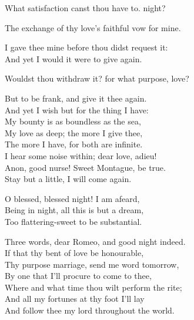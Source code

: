\begin{speech}
What satisfaction canst thou have to. night? \\
\end{speech}
\begin{speech}
The exchange of thy love's faithful vow for mine.
\\
\end{speech}
\begin{speech}
I gave thee mine before thou didst request it: \\

And yet I would it were to give again. \\
\end{speech}
\begin{speech}
Wouldst thou withdraw it? for what purpose, love?
\\
\end{speech}
\begin{speech}
But to be frank, and give it thee again. \\
And yet I wish but for the thing I have: \\
My bounty is as boundless as the sea, \\
My love as deep; the more I give thee, \\
The more I have, for both are infinite. 
\\
I hear some noise within; dear love, adieu! \\
Anon, good nurse!   Sweet Montague, be true. \\
Stay but a little, I will come again.  \\

\end{speech}
\begin{speech}
O blessed, blessed   night! I am afeard, \\
Being in night, all this is but a dream, \\
Too flattering-sweet to be substantial. 
\\
\end{speech}
\begin{speech}
Three words, dear Romeo, and good night indeed. \\

If that thy bent of love be honourable, \\
Thy purpose marriage, send me word tomorrow, \\
By one that I'll procure to come to thee, \\
Where and what time thou wilt perform the rite; \\
And all my fortunes at thy foot I'll lay \\
And follow thee my lord throughout the world. \\
\end{speech}

